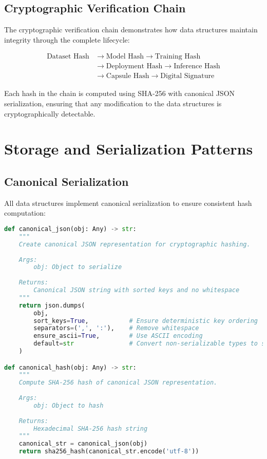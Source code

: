 \documentclass[12pt,a4paper]{article}
\begin{document}
\subsection{Cryptographic Verification Chain}

The cryptographic verification chain demonstrates how data structures maintain integrity through the complete lifecycle:

\begin{align}
\text{Dataset Hash} &\rightarrow \text{Model Hash} \rightarrow \text{Training Hash} \\
&\rightarrow \text{Deployment Hash} \rightarrow \text{Inference Hash} \\
&\rightarrow \text{Capsule Hash} \rightarrow \text{Digital Signature}
\end{align}

Each hash in the chain is computed using SHA-256 with canonical JSON serialization, ensuring that any modification to the data structures is cryptographically detectable.

\section{Storage and Serialization Patterns}

\subsection{Canonical Serialization}

All data structures implement canonical serialization to ensure consistent hash computation:

\begin{lstlisting}[language=Python, caption=Canonical JSON Serialization]
def canonical_json(obj: Any) -> str:
    """
    Create canonical JSON representation for cryptographic hashing.
    
    Args:
        obj: Object to serialize
        
    Returns:
        Canonical JSON string with sorted keys and no whitespace
    """
    return json.dumps(
        obj,
        sort_keys=True,           # Ensure deterministic key ordering
        separators=(',', ':'),    # Remove whitespace
        ensure_ascii=True,        # Use ASCII encoding
        default=str               # Convert non-serializable types to strings
    )

def canonical_hash(obj: Any) -> str:
    """
    Compute SHA-256 hash of canonical JSON representation.
    
    Args:
        obj: Object to hash
        
    Returns:
        Hexadecimal SHA-256 hash string
    """
    canonical_str = canonical_json(obj)
    return sha256_hash(canonical_str.encode('utf-8'))
\end{lstlisting}
\end{document}
